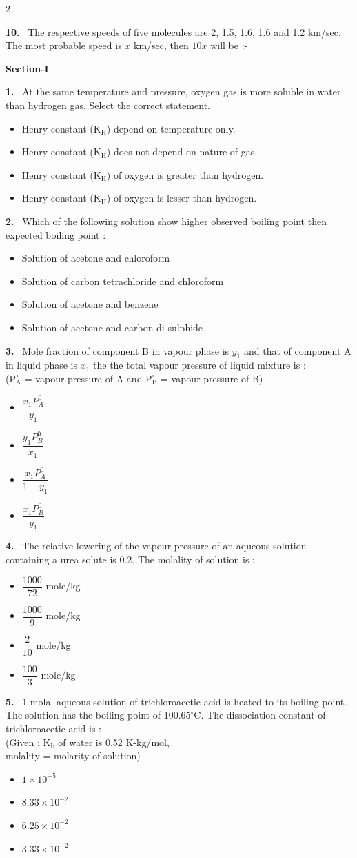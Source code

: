 \documentclass[10pt]{extarticle}
\newcommand{\partsec}[2]{\par\medskip\noindent{\large\bfseries PART-#1: #2}\par\smallskip}
\newcommand{\sect}[1]{\par\smallskip\noindent\textbf{#1}\par}
\newcommand{\qn}[1]{\par\smallskip\noindent\textbf{#1.}~}
\newenvironment{qoptions}{\begin{itemize}[leftmargin=1.8em,itemsep=1pt,topsep=2pt,label={}]}{\end{itemize}}
\newcommand{\opt}[2]{\item[(#1)] #2}
\begin{document}
\begin{multicols}{2}
\qn{10} The respective speeds of five molecules are 2, 1.5, 1.6, 1.6 and 1.2 km/sec. The most probable speed is $x$ km/sec, then $10x$ will be :-

\partsec{2}{CHEMISTRY}
\sect{Section-I}

\qn{1} At the same temperature and pressure, oxygen gas is more soluble in water than hydrogen gas. Select the correct statement.
\begin{qoptions}
\opt{A}{Henry constant (K$_\mathrm{H}$) depend on temperature only.}
\opt{B}{Henry constant (K$_\mathrm{H}$) does not depend on nature of gas.}
\opt{C}{Henry constant (K$_\mathrm{H}$) of oxygen is greater than hydrogen.}
\opt{D}{Henry constant (K$_\mathrm{H}$) of oxygen is lesser than hydrogen.}
\end{qoptions}

\qn{2} Which of the following solution show higher observed boiling point then expected boiling point :
\begin{qoptions}
\opt{A}{Solution of acetone and chloroform}
\opt{B}{Solution of carbon tetrachloride and chloroform}
\opt{C}{Solution of acetone and benzene}
\opt{D}{Solution of acetone and carbon-di-sulphide}
\end{qoptions}

\qn{3} Mole fraction of component B in vapour phase is $y_1$ and that of component A in liquid phase is $x_1$ the the total vapour pressure of liquid mixture is :\\
($\mathrm{P^\circ_A}$ = vapour pressure of A and $\mathrm{P^\circ_B}$ = vapour pressure of B)
\begin{qoptions}
\opt{A}{$\dfrac{x_1P_A^0}{y_1}$}
\opt{B}{$\dfrac{y_1P_B^0}{x_1}$}
\opt{C}{$\dfrac{x_1P_A^0}{1-y_1}$}
\opt{D}{$\dfrac{x_1P_B^0}{y_1}$}
\end{qoptions}

\qn{4} The relative lowering of the vapour pressure of an aqueous solution containing a urea solute is 0.2. The molality of solution is :
\begin{qoptions}
\opt{A}{$\dfrac{1000}{72}$ mole/kg}
\opt{B}{$\dfrac{1000}9$ mole/kg}
\opt{C}{$\dfrac2{10}$ mole/kg}
\opt{D}{$\dfrac{100}3$ mole/kg}
\end{qoptions}

\qn{5} 1 molal aqueous solution of trichloroacetic acid is heated to its boiling point. The solution has the boiling point of 100.65$^\circ$C. The dissociation constant of trichloroacetic acid is :\\
(Given : K$_\mathrm{b}$ of water is 0.52 K-kg/mol,\\
molality = molarity of solution)
\begin{qoptions}
\opt{A}{$1\times10^{-5}$}
\opt{B}{$8.33\times10^{-2}$}
\opt{C}{$6.25\times10^{-2}$}
\opt{D}{$3.33\times10^{-2}$}
\end{qoptions}


\end{multicols}
\end{document}
